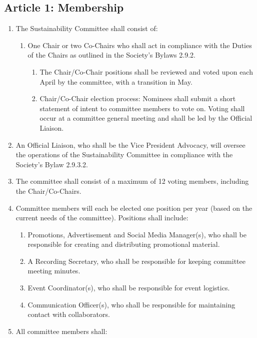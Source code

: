 \subsection{Article 1: Membership}
\begin{enumerate}[label*=\arabic*., align=left]	
\item The Sustainability Committee shall consist of:
\begin{enumerate}[label*=\arabic*., align=left]	
\item One Chair or two Co-Chairs who shall act in compliance with the Duties of the Chairs as outlined in the Society’s Bylaws 2.9.2.
\begin{enumerate}[label*=\arabic*., align=left]
\item The Chair/Co-Chair positions shall be reviewed and voted upon each April by the committee, with a transition in May.
\item Chair/Co-Chair election process: Nominees shall submit a short statement of intent to committee members to vote on. Voting shall occur at a committee general meeting and shall be led by the Official Liaison.
\end{enumerate}
\end{enumerate}
\item An Official Liaison, who shall be the Vice President Advocacy, will oversee the operations of the Sustainability Committee in compliance with the Society’s Bylaw 2.9.3.2.
\item The committee shall consist of a maximum of 12 voting members, including the Chair/Co-Chairs.
\item Committee members will each be elected one position per year (based on the current needs of the committee). Positions shall include:
\begin{enumerate}[label*=\arabic*., align=left]
\item Promotions, Advertisement and Social Media Manager(s), who shall be responsible for creating and distributing promotional material.
\item A Recording Secretary, who shall be responsible for keeping committee meeting minutes.
\item Event Coordinator(s), who shall be responsible for event logistics.
\item Communication Officer(s), who shall be responsible for maintaining contact with collaborators.
\end{enumerate}
\item All committee members shall:
\begin{enumerate}[label*=\arabic*., align=left]

\end{enumerate}
\end{enumerate}
